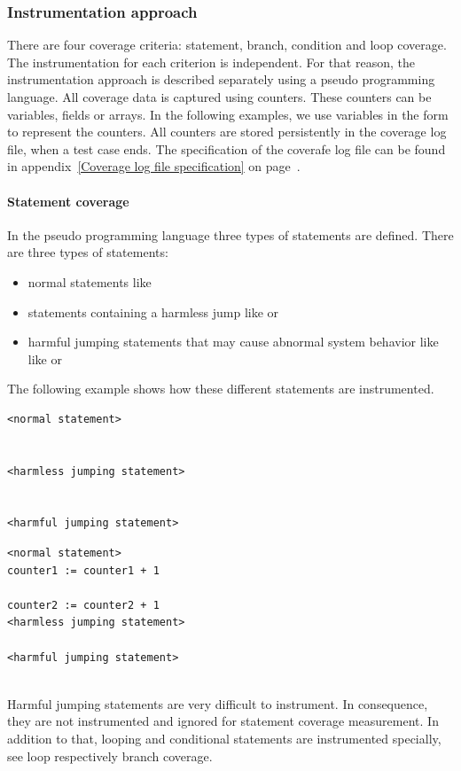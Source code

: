\subsubsection{Instrumentation approach}
There are four coverage criteria: statement, branch, condition and loop coverage. The instrumentation for each criterion is independent. For that reason, the instrumentation approach is described separately using a pseudo programming language. All coverage data is captured using counters. These counters can be variables, fields or arrays. In the following examples, we use variables in the form  to represent the counters. All counters are stored persistently in the coverage log file, when a test case ends. The specification of the coverafe log file can be found in appendix~\ref{Coverage log file specification} on page~\pageref{Coverage log file specification}.
\paragraph{Statement coverage}
In the pseudo programming language three types of statements are defined. There are three types of statements:
\begin{itemize}
\item normal statements like 
\item statements containing a harmless jump like  or 
\item harmful jumping statements that may cause abnormal system behavior like like  or 
\end{itemize}
The following example shows how these different statements are instrumented.
\newline\\
\begin{minipage}[t]{0.5\textwidth}
\begin{verbatim}
<normal statement>


<harmless jumping statement>


<harmful jumping statement>
\end{verbatim}
\end{minipage}
\begin{minipage}[t]{0.5\textwidth}
\begin{verbatim}
<normal statement>
counter1 := counter1 + 1

counter2 := counter2 + 1
<harmless jumping statement>

<harmful jumping statement>
\end{verbatim}
\end{minipage}
\newline\\
Harmful jumping statements are very difficult to instrument. In consequence, they are not instrumented and ignored for statement coverage measurement. In addition to that, looping and conditional statements are instrumented specially, see loop respectively branch coverage.

